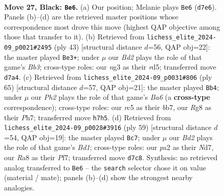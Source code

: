 \documentclass[11pt]{article}
\begin{document}
\clearpage

\begin{figure}[p]\centering
\begin{subfigure}{0.46\textwidth}\centering
\resizebox{\linewidth}{!}{%
\newchessgame
\chessboard[
  setfen={r4kr1/1p1b1p1p/p5p1/2Rp4/8/3K1PN1/PP2B1PP/7R b - - 0 27},
  showmover=false,
  pgfstyle=straightmove, color=movearrow, markmove={d7-e6}
]}
\caption{}
\end{subfigure}\hfill
\begin{subfigure}{0.46\textwidth}\centering
\resizebox{\linewidth}{!}{%
\newchessgame
\chessboard[
  setfen={r1k4r/1pp2Rpp/pb6/3R4/2P1p3/6P1/PP2B2P/2K5 b - - 0 22},
  showmover=false,
  pgfstyle=straightmove, color=movearrow, markmove={b6-e3}
]}
\caption{}
\end{subfigure}
\\[4pt]
\begin{subfigure}{0.46\textwidth}\centering
\resizebox{\linewidth}{!}{%
\newchessgame
\chessboard[
  setfen={3k4/1B3p1p/p2rpnp1/Pp6/8/bP2N1P1/2R2P1P/5K2 b - - 6 33},
  showmover=false,
  pgfstyle=straightmove, color=movearrow, markmove={a3-b4}
]}
\caption{}
\end{subfigure}\hfill
\begin{subfigure}{0.46\textwidth}\centering
\resizebox{\linewidth}{!}{%
\newchessgame
\chessboard[
  setfen={3b1rk1/3n1p1p/2r3p1/1R6/1pNp4/1B1P2P1/5P1P/4R1K1 b - - 1 30},
  showmover=false,
  pgfstyle=straightmove, color=movearrow, markmove={d8-c7}
]}
\caption{}
\end{subfigure}
\caption{\textbf{Move 27, Black: \texttt{Be6}.} (a) Our position; Melanie plays \texttt{Be6} (\texttt{d7e6}). Panels (b)--(d) are the retrieved master positions whose correspondence most drove this move (highest QAP objective among those that transfer to it). (b) Retrieved from \texttt{lichess\_elite\_2024-09\_p0021\#2495} (ply 43) [structural distance $d$=56, QAP obj=22]: the master played \texttt{Be3+}; under $\mu$ our \emph{Bd2} plays the role of that game's \emph{Bb3}; cross-type roles: our \emph{n}g3 as their \emph{r}d5; transferred move \texttt{d7a4}. (c) Retrieved from \texttt{lichess\_elite\_2024-09\_p0031\#806} (ply 65) [structural distance $d$=57, QAP obj=21]: the master played \texttt{Bb4}; under $\mu$ our \emph{Ph2} plays the role of that game's \emph{Ba6} (a \textbf{cross-type} correspondence); cross-type roles: our \emph{r}c5 as their \emph{b}b7, our \emph{R}g8 as their \emph{P}h7; transferred move \texttt{h7h5}. (d) Retrieved from \texttt{lichess\_elite\_2024-09\_p0028\#3916} (ply 59) [structural distance $d$=54, QAP obj=19]: the master played \texttt{Bc7}; under $\mu$ our \emph{Bd2} plays the role of that game's \emph{Bd1}; cross-type roles: our \emph{p}a2 as their \emph{N}d7, our \emph{R}a8 as their \emph{P}f7; transferred move \texttt{d7c8}. Synthesis: no retrieved analog transferred to \texttt{Be6} -- the \texttt{search} selector chose it on value (material / mate); panels (b)--(d) show the strongest nearby analogies.}
\label{fig:thought-m53}
\end{figure}
\end{document}
